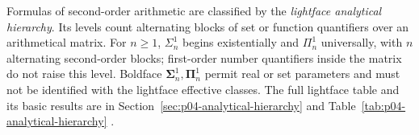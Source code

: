 Formulas of second-order arithmetic are classified by the
\emph{lightface analytical hierarchy}.  Its levels count alternating blocks of set or function
quantifiers over an arithmetical matrix.  For \(n\geq1\), \(\Sigma^1_n\)
begins existentially and \(\Pi^1_n\) universally, with \(n\) alternating
second-order blocks;
first-order number quantifiers inside the matrix do not raise this level.
Boldface \(\boldsymbol{\Sigma}^1_n,\boldsymbol{\Pi}^1_n\) permit real or set
parameters and must not be identified with the lightface effective classes.
The full lightface table and its basic results are in
Section~\ref{sec:p04-analytical-hierarchy} and
Table~\ref{tab:p04-analytical-hierarchy}
\cite{Kleene1952,Rogers1967,Moschovakis2009}.
